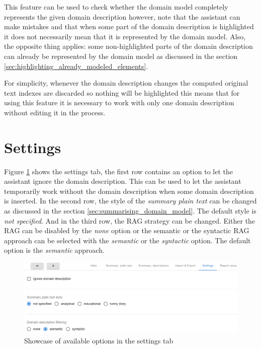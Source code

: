 This feature can be used to check whether the domain model completely represents the given domain description however, note that the assistant can make mistakes and that when some part of the domain description is highlighted it does not necessarily mean that it is represented by the domain model. Also, the opposite thing applies: some non-highlighted parts of the domain description can already be represented by the domain model as discussed in the section \ref{sec:highlighting_already_modeled_elements}.

For simplicity, whenever the domain description changes the computed original text indexes are discarded so nothing will be highlighted this means that for using this feature it is necessary to work with only one domain description without editing it in the process.


\section{Settings}

Figure \ref{fig:settings_tab} shows the settings tab, the first row contains an option to let the assistant ignore the domain description. This can be used to let the assistant temporarily work without the domain description when some domain description is inserted. In the second row, the style of the \emph{summary plain text} can be changed as discussed in the section \ref{sec:summarising_domain_model}. The default style is \textit{not specified}. And in the third row, the RAG strategy can be changed. Either the RAG can be disabled by the \textit{none} option or the semantic or the syntactic RAG approach can be selected with the \textit{semantic} or the \textit{syntactic} option. The default option is the \textit{semantic} approach.

\begin{figure}[!h]
    \includegraphics[scale=0.46]{../docs/images/frontend/settings.png}
    \caption{\centering Showcase of available options in the settings tab}
    \label{fig:settings_tab}
\end{figure}



